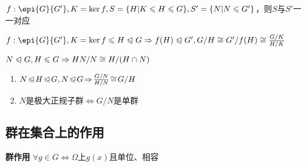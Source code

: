 \documentclass[b4paper, 10pt]{ctexart}
\newcommand*{\impl}{\Rightarrow}
\renewcommand*{\iff}{\Leftrightarrow}
\renewcommand*{\leq}{\leqslant}
\newcommand*{\nmsubgroupeq}{\trianglelefteqslant}
\begin{document}
\begin{multicols}{3}
\begin{theorem}[同态基本定理]
    \end{theorem}

    \begin{theorem}[子群对应定理]
        $f: \epi{G}{G'}, K = \ker f, S = \{ H | K \leq H \leq G \}, S' = \{ N | N \leq G' \}$，则$S$与$S'$一一对应
    \end{theorem}

    \begin{theorem}
        \hfil

        $f: \epi{G}{G'}, K = \ker f \leq H \nmsubgroupeq G \impl f(H) \nmsubgroupeq G', G/H \cong G'/f(H) \cong \frac{G/K}{H/K}$
    \end{theorem}

    \begin{theorem}
        \hfil

        $N \nmsubgroupeq G, H \leq G \impl HN/N \cong H/(H \cap N)$
    \end{theorem}

    \begin{theorem}[推论]
        \hfil
        \begin{enumerate}
            \item $N \!\nmsubgroupeq\! H \!\nmsubgroupeq\! G, N \!\nmsubgroupeq\! G \!\impl\! \frac{G/N}{H/N} \!\cong\! G/H$
            \item $N$是极大正规子群$\iff G/N$是单群
        \end{enumerate}
    \end{theorem}

    \subsection{群在集合上的作用}

    \textbf{群作用} $\forall g \in G \iff \Omega$上$g(x)$且单位、相容


\end{multicols}
\end{document}
